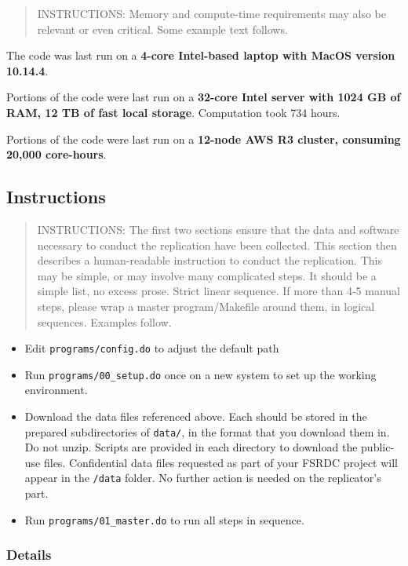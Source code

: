 \documentclass[
]{article}
\providecommand{\tightlist}{%
  \setlength{\itemsep}{0pt}\setlength{\parskip}{0pt}}
\begin{document}
\begin{quote}
INSTRUCTIONS: Memory and compute-time requirements may also be relevant
or even critical. Some example text follows.
\end{quote}

The code was last run on a \textbf{4-core Intel-based laptop with MacOS
version 10.14.4}.

Portions of the code were last run on a \textbf{32-core Intel server
with 1024 GB of RAM, 12 TB of fast local storage}. Computation took 734
hours.

Portions of the code were last run on a \textbf{12-node AWS R3 cluster,
consuming 20,000 core-hours}.

\hypertarget{instructions}{%
\subsection{Instructions}\label{instructions}}

\begin{quote}
INSTRUCTIONS: The first two sections ensure that the data and software
necessary to conduct the replication have been collected. This section
then describes a human-readable instruction to conduct the replication.
This may be simple, or may involve many complicated steps. It should be
a simple list, no excess prose. Strict linear sequence. If more than 4-5
manual steps, please wrap a master program/Makefile around them, in
logical sequences. Examples follow.
\end{quote}

\begin{itemize}
\tightlist
\item
  Edit \texttt{programs/config.do} to adjust the default path
\item
  Run \texttt{programs/00\_setup.do} once on a new system to set up the
  working environment.
\item
  Download the data files referenced above. Each should be stored in the
  prepared subdirectories of \texttt{data/}, in the format that you
  download them in. Do not unzip. Scripts are provided in each directory
  to download the public-use files. Confidential data files requested as
  part of your FSRDC project will appear in the \texttt{/data} folder.
  No further action is needed on the replicator's part.
\item
  Run \texttt{programs/01\_master.do} to run all steps in sequence.
\end{itemize}

\hypertarget{details}{%
\subsubsection{Details}\label{details}}
\end{document}
